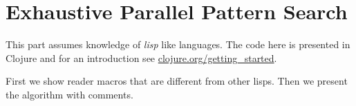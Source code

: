 \chapter{Exhaustive Parallel Pattern Search}
\label{add:epps}

This part assumes knowledge of \emph{lisp} like languages. 
The code here is presented in Clojure and for an 
introduction see \url{clojure.org/getting_started}.

First we show reader macros that are different from other 
lisps. Then we present the algorithm with comments.







